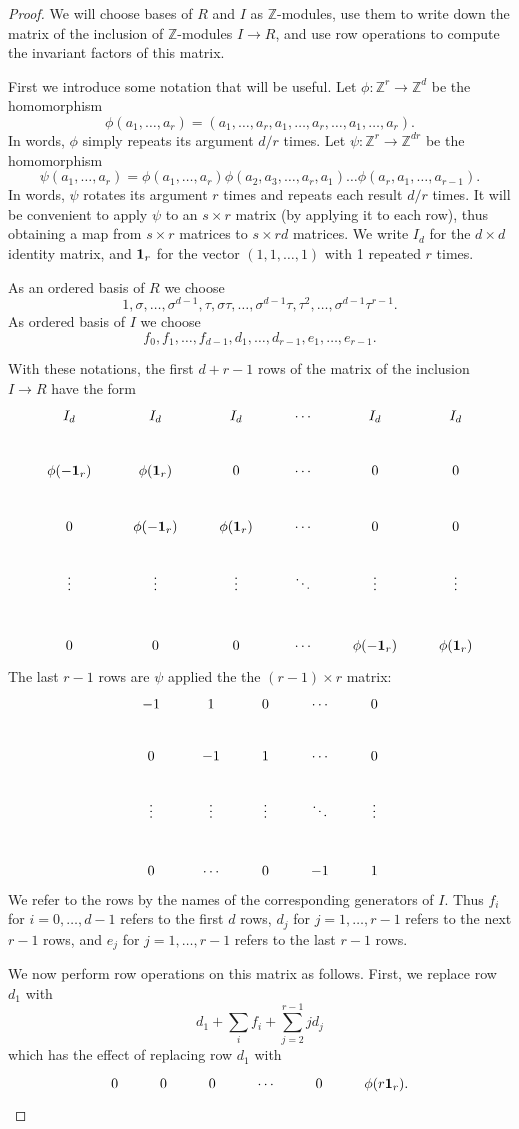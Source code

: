 \documentclass[reqno]{amsart}
\theoremstyle{definition}
\theoremstyle{remark}
\newcommand{\one}{{\bf 1}}
\def\Z{\mathbb{Z}}
\begin{document}
\begin{proof}
We will choose bases of $R$ and $I$ as $\Z$-modules, use them to write
down the matrix of the inclusion of $\Z$-modules $I\to R$, and use row
operations to compute the invariant factors of this matrix.

First we introduce some notation that will be useful.  Let
$\phi:\Z^r\to\Z^d$ be the homomorphism
$$\phi(a_1,\dots,a_r)=(a_1,\dots,a_r,a_1,\dots,a_r,\dots,a_1,\dots,a_r).$$
In words, $\phi$ simply repeats its argument $d/r$ times.  Let
$\psi:\Z^r\to\Z^{dr}$ be the homomorphism
$$\psi(a_1,\dots,a_r)=
\phi(a_1,\dots,a_r)\phi(a_2,a_3,\dots,a_r,a_1)\dots
\phi(a_r,a_1,\dots,a_{r-1}).$$ In words, $\psi$ rotates its argument
$r$ times and repeats each result $d/r$ times.  It will be convenient
to apply $\psi$ to an $s\times r$ matrix (by applying it to each row),
thus obtaining a map from $s\times r$ matrices to $s\times rd$
matrices.  We write $I_d$ for the $d\times d$ identity matrix, and
$\one_r$ for the vector $(1,1,\dots,1)$ with 1 repeated $r$ times.

As an ordered basis of $R$ we choose
$$1,\sigma,\dots,\sigma^{d-1},\tau,\sigma\tau,\dots,\sigma^{d-1}\tau,
\tau^2,\dots,\sigma^{d-1}\tau^{r-1}.$$
As ordered basis of $I$ we choose 
$$f_0,f_1,\dots,f_{d-1},d_1,\dots,d_{r-1},e_1,\dots,e_{r-1}.$$

With these notations, the first $d+r-1$ rows of the matrix of the
inclusion $I\to R$ have the form
$$\xymatrix{
I_d&I_d&I_d&\cdots&I_d&I_d\\
\phi(-\one_r)&\phi(\one_r)&0&\cdots&0&0\\
0&\phi(-\one_r)&\phi(\one_r)&\cdots&0&0\\
\vdots&\vdots&\vdots&\ddots&\vdots&\vdots\\
0&0&0&\cdots&\phi(-\one_r)&\phi(\one_r)
}$$
The last $r-1$ rows are $\psi$ applied the the $(r-1)\times r$ matrix:
$$%
\xymatrix{-1&1&0&\cdots&0\\
0&-1&1&\cdots&0\\
\vdots&\vdots&\vdots&\ddots&\vdots\\
0&\cdots&0&-1&1}%
$$
We refer to the rows by the names of the corresponding generators of
$I$.  Thus $f_i$ for $i=0,\dots,d-1$ refers to the first $d$
rows, $d_j$ for $j=1,\dots,r-1$ refers to the next $r-1$ rows, and
$e_j$ for $j=1,\dots,r-1$ refers to the last $r-1$ rows.

We now perform row operations on this matrix as follows.  First, we
replace row $d_1$ with 
$$d_1+\sum_i f_i+\sum_{j=2}^{r-1}jd_j$$
which has the effect of replacing row $d_1$ with
$$\xymatrix{0&0&0&\cdots&0&\phi(r\one_r).}$$


\end{proof}
\end{document}
